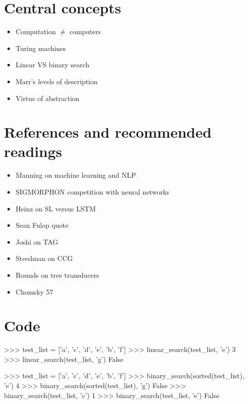 \section*{Central concepts}

\begin{itemize}
    \item Computation $\neq$ computers
    \item Turing machines
    \item Linear VS binary search
    \item Marr's levels of description
    \item Virtue of abstraction
\end{itemize}

\section*{References and recommended readings}

\begin{itemize}
    \item Manning on machine learning and NLP
    \item SIGMORPHON competition with neural networks
    \item Heinz on SL versus LSTM
    \item Sean Fulop quote
    \item Joshi on TAG
    \item Steedman on CCG
    \item Rounds on tree transducers
    \item Chomsky 57
\end{itemize}


\section*{Code}
%
\begin{center}
\end{center}
\begin{center}
    \begin{pythoncode}
        >>> test_list = ['a', 'c', 'd', 'e', 'b', 'f']
        >>> linear_search(test_list, 'e')
        3
        >>> linear_search(test_list, 'g')
        False
    \end{pythoncode}
\end{center}

\begin{center}
\end{center}
\begin{center}
    \begin{pythoncode}
        >>> test_list = ['a', 'c', 'd', 'e', 'b', 'f']
        >>> binary_search(sorted(test_list), 'e')
        4
        >>> binary_search(sorted(test_list), 'g')
        False
        >>> binary_search(test_list, 'c')
        1
        >>> binary_search(test_list, 'e')
        False
    \end{pythoncode}
\end{center}
